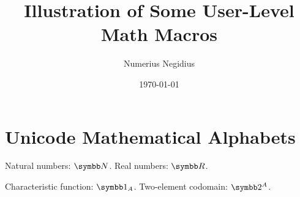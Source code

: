 \documentclass[
    dina4,
    parskip=full,
]{scrreport}
\title{Illustration of Some User-Level Math Macros}
\author{Numerius Negidius}
\date{1970-01-01}
\begin{document}
\maketitle

\section{Unicode Mathematical Alphabets}

Natural numbers: $\IN$. Real numbers: $\IR$.

Characteristic function: $\One_A$. Two-element codomain: $\Two^A$.
\end{document}
